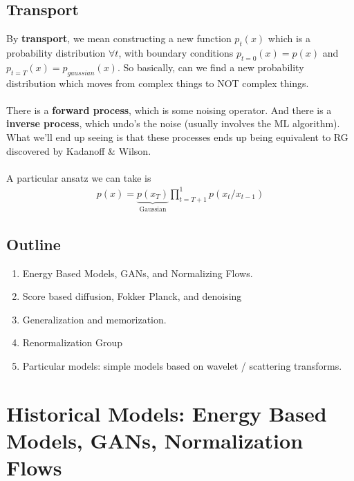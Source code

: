 \subsection{Transport}
By \textbf{transport}, we mean constructing a new function $p_t(x)$ which is a probability distribution $\forall t$, with boundary conditions $p_{t=0}(x) =  p(x)$ and $p_{t=T}(x) = p_{gaussian}(x)$. So basically, can we find a new probability distribution which moves from complex things to NOT complex things.\\
\\
There is a \textbf{forward process}, which is some noising operator. And there is a \textbf{inverse process}, which undo's the noise (usually involves the ML algorithm). What we'll end up seeing is that these processes ends up being equivalent to RG discovered by Kadanoff \& Wilson.
\\
\\
A particular ansatz we can take is
\begin{align}
	p(x) = \underbrace{p(x_T)}_{\text{Gaussian}} \prod_{t=T+1}^1 p(x_t / x_{t-1})
\end{align}
\subsection{Outline}
\begin{enumerate}
	\item Energy Based Models, GANs, and Normalizing Flows.
	\item Score based diffusion, Fokker Planck, and denoising
	\item Generalization and memorization.
	\item Renormalization Group
	\item Particular models: simple models based on wavelet / scattering transforms.
\end{enumerate}

\section{Historical Models: Energy Based Models, GANs, Normalization Flows}

